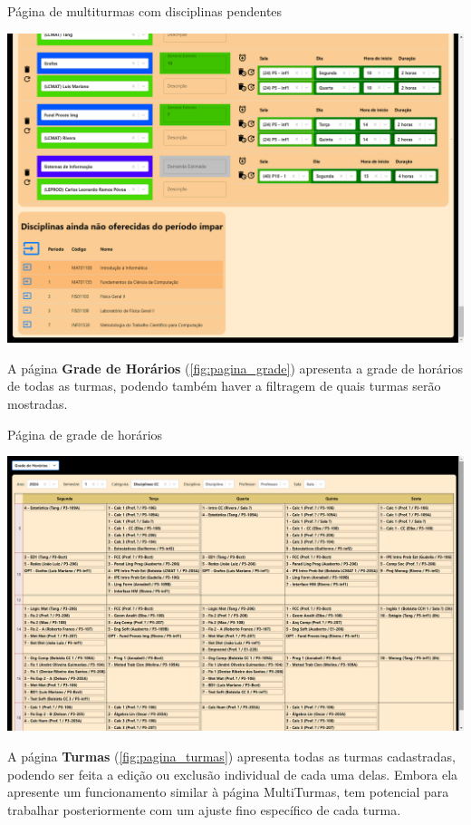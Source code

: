 \begin{MyCenteredFigure} \caption{Página de multiturmas com disciplinas pendentes} \label{fig:pagina_multiDisciplinas}
  \includegraphics[width=\textwidth]{files/img/2.02!7-resultados/4-Multiturmas-DisciplinasPendentes.png}
\end{MyCenteredFigure}

A página \textbf{Grade de Horários} (\autoref{fig:pagina_grade}) apresenta a grade de horários de todas as turmas, podendo também haver a filtragem de quais turmas serão mostradas.

\begin{MyCenteredFigure} \caption{Página de grade de horários} \label{fig:pagina_grade}
  \includegraphics[width=\textwidth]{files/img/2.02!7-resultados/5-Grade de Horários.png}
\end{MyCenteredFigure}

A página \textbf{Turmas} (\autoref{fig:pagina_turmas}) apresenta todas as turmas cadastradas, podendo ser feita a edição ou exclusão individual de cada uma delas. Embora ela apresente um funcionamento similar à página MultiTurmas, tem potencial para trabalhar posteriormente com um ajuste fino específico de cada turma.

